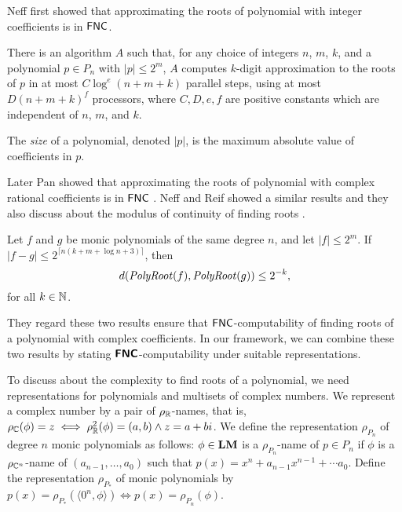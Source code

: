 \documentclass[envcountsame,orivec,oribibl]{llncs}
\begin{document}
Neff first showed that approximating the roots of polynomial
with integer coefficients is in $\mathsf{FNC}$.
\begin{theorem}
\label{theorem:neff1994}
There is an algorithm $A$ such that,
for any choice of integers $n$, $m$, $k$, and a polynomial $p \in P_n$
with $|p| \le 2^m$,
$A$ computes $k$-digit approximation to the roots of $p$ 
in at most $C \log^e(n + m + k)$ parallel steps, 
using at most $D(n + m + k)^f$ processors, where $C, D, e, f$ are positive
constants which are independent of $n$, $m$, and $k$.
\end{theorem}
The \emph{size} of a polynomial, denoted $|p|$, is the maximum absolute value
 of coefficients in $p$.

Later Pan showed that approximating the roots of polynomial
with complex rational coefficients is in $\mathsf{FNC}$ \cite{pan1995optimal}.
Neff and Reif showed a similar results and they also discuss
about the modulus of continuity of finding roots \cite{neff1996efficient}.

\begin{theorem}
 Let $f$ and $g$ be monic polynomials of the same degree $n$,
 and let $|f| \le 2^m$.
 If $|f - g| \le 2^{\lceil n(k + m + \log n + 3)\rceil}$, then
 \begin{equation}
  d(\mathit{PolyRoot}(f), \mathit{PolyRoot}(g)) \le 2^{-k},
 \end{equation}
 for all $k \in \mathbb N$.
\end{theorem}

They regard these two results ensure that $\mathsf{FNC}$-computability
of finding roots of a polynomial with complex coefficients.
In our framework, we can combine these two results by stating 
$\text{\bfseries \sffamily \upshape FNC}$-computability under suitable representations.

To discuss about the complexity to find roots of a polynomial,
we need representations for polynomials and multisets of complex numbers.
We represent a complex number by a pair of $\rho _\mathbb R$-names,
that is, $\rho_\mathbb C(\phi) = z \iff \rho_\mathbb R^2(\phi) = (a, b) \wedge z = a+bi$.
We define the representation $\rho_{P_n}$ of degree $n$ monic polynomials as follows: 
$\phi \in \mathbf{LM}$ is a $\rho_{P_n}$-name of $p \in P_n$ 
if $\phi$ is a $\rho_{\mathbb C^n}$-name of $(a_{n-1}, \dots, a_0)$ 
such that $p(x) = x^n + a_{n-1}x^{n-1} + \cdots a_0$.
Define the representation $\rho_{P_*}$ of monic polynomials by
$p(x) = \rho_{P_*}(\langle 0^n, \phi \rangle) \iff p(x) = \rho_{P_n}(\phi)$.
\end{document}
